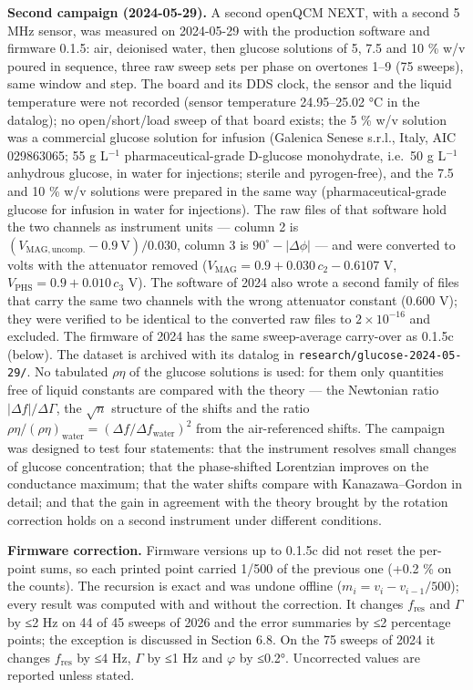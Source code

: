 \documentclass[11pt,a4paper]{article}
\begin{document}
\textbf{Second campaign (2024-05-29).} A second openQCM NEXT, with a
second 5 MHz sensor, was measured on 2024-05-29 with the production
software and firmware 0.1.5: air, deionised water, then glucose
solutions of 5, 7.5 and 10 \% w/v poured in sequence, three raw sweep
sets per phase on overtones 1--9 (75 sweeps), same window and step. The
board and its DDS clock, the sensor and the liquid temperature were not
recorded (sensor temperature 24.95--25.02 °C in the datalog); no
open/short/load sweep of that board exists; the 5 \% w/v solution was a
commercial glucose solution for infusion (Galenica Senese s.r.l., Italy,
AIC 029863065; 55 g L\(^{-1}\) pharmaceutical-grade D-glucose
monohydrate, i.e.~50 g L\(^{-1}\) anhydrous glucose, in water for
injections; sterile and pyrogen-free), and the 7.5 and 10 \% w/v
solutions were prepared in the same way (pharmaceutical-grade glucose
for infusion in water for injections). The raw files of that software
hold the two channels as instrument units --- column 2 is
\((V_\mathrm{MAG,uncomp.} - 0.9\ \mathrm{V})/0.030\), column 3 is
\(90^\circ - |\Delta\phi|\) --- and were converted to volts with the
attenuator removed (\(V_\mathrm{MAG} = 0.9 + 0.030\,c_2 - 0.6107\) V,
\(V_\mathrm{PHS} = 0.9 + 0.010\,c_3\) V). The software of 2024 also
wrote a second family of files that carry the same two channels with the
wrong attenuator constant (0.600 V); they were verified to be identical
to the converted raw files to \(2\times10^{-16}\) and excluded. The
firmware of 2024 has the same sweep-average carry-over as 0.1.5c
(below). The dataset is archived with its datalog in
\texttt{research/glucose-2024-05-29/}. No tabulated \(\rho\eta\) of the
glucose solutions is used: for them only quantities free of liquid
constants are compared with the theory --- the Newtonian ratio
\(|\Delta f|/\Delta\Gamma\), the \(\sqrt n\) structure of the shifts and
the ratio
\(\rho\eta/(\rho\eta)_\mathrm{water} = (\Delta f/\Delta f_\mathrm{water})^2\)
from the air-referenced shifts. The campaign was designed to test four
statements: that the instrument resolves small changes of glucose
concentration; that the phase-shifted Lorentzian improves on the
conductance maximum; that the water shifts compare with Kanazawa--Gordon
in detail; and that the gain in agreement with the theory brought by the
rotation correction holds on a second instrument under different
conditions.

\textbf{Firmware correction.} Firmware versions up to 0.1.5c did not
reset the per-point sums, so each printed point carried 1/500 of the
previous one (+0.2 \% on the counts). The recursion is exact and was
undone offline (\(m_i = v_i - v_{i-1}/500\)); every result was computed
with and without the correction. It changes \(f_\mathrm{res}\) and
\(\Gamma\) by ≤2 Hz on 44 of 45 sweeps of 2026 and the error summaries
by ≤2 percentage points; the exception is discussed in Section 6.8. On
the 75 sweeps of 2024 it changes \(f_\mathrm{res}\) by ≤4 Hz, \(\Gamma\)
by ≤1 Hz and \(\varphi\) by ≤0.2°. Uncorrected values are reported
unless stated.
\end{document}
